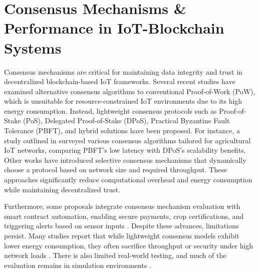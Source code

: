 \documentclass[12pt,onecolumn]{IEEEtran} %
\begin{document}
\section{Consensus Mechanisms \& Performance in IoT-Blockchain Systems}
Consensus mechanisms are critical for maintaining data integrity and trust in decentralized blockchain-based IoT frameworks. Several recent studies have examined alternative consensus algorithms to conventional Proof-of-Work (PoW), which is unsuitable for resource-constrained IoT environments due to its high energy consumption. Instead, lightweight consensus protocols such as Proof-of-Stake (PoS), Delegated Proof-of-Stake (DPoS), Practical Byzantine Fault Tolerance (PBFT), and hybrid solutions have been proposed. For instance, a study outlined in \cite{ali2022blockchainenabledarchitecture} surveyed various consensus algorithms tailored for agricultural IoT networks, comparing PBFT's low latency with DPoS's scalability benefits. Other works \cite{morais2023surveyonintegration, khan2022ablockchainand} have introduced selective consensus mechanisms that dynamically choose a protocol based on network size and required throughput. These approaches significantly reduce computational overhead and energy consumption while maintaining decentralized trust.

Furthermore, some proposals integrate consensus mechanism evaluation with smart contract automation, enabling secure payments, crop certifications, and triggering alerts based on sensor inputs \cite{saha2022blockchainchangingthe, khan2022ablockchainand}. Despite these advances, limitations persist. Many studies report that while lightweight consensus models exhibit lower energy consumption, they often sacrifice throughput or security under high network loads \cite{saha2022blockchainchangingthe, ali2022blockchainenabledarchitecture}. There is also limited real-world testing, and much of the evaluation remains in simulation environments \cite{khan2022ablockchainand}.
\end{document}
